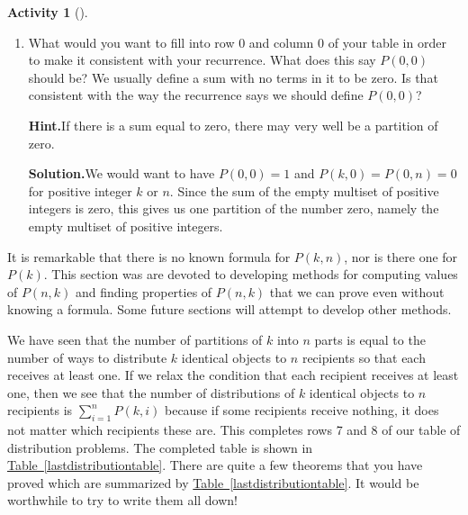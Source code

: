 \documentclass[10pt,]{book}
\theoremstyle{plain}
\theoremstyle{definition}
\newtheorem{activity}[project]{Activity}
\numberwithin{equation}{chapter}
\begin{document}
\begin{activity}[]
\begin{enumerate}[label=(\alph*)]
~\par
\item What would you want to fill into row 0 and column 0 of your table in order to make it consistent with your recurrence.  What does this say \(P(0,0)\) should be?  We usually define a sum with no terms in it to be zero. Is that consistent with the way the recurrence says we should define \(P(0,0)\)?%
\par\medskip\noindent%
\textbf{Hint.}\quad If there is a sum equal to zero, there may very well be a partition of zero.%
\par\medskip\noindent%
\textbf{Solution.}\quad We would want to have \(P(0,0)=1\) and \(P(k,0)=P(0,n)=0\) for positive integer \(k\) or \(n\). Since the sum of the empty multiset of positive integers is zero, this gives us one partition of the number zero, namely the empty multiset of positive integers.%

\end{enumerate}
\end{activity}
It is remarkable that there is no known formula for \(P(k,n)\), nor is there one for \(P(k)\). This section was are devoted to developing methods for computing values of \(P(n,k)\) and finding properties of \(P(n,k)\) that we can prove even without knowing a formula. Some future sections will attempt to develop other methods.%
\par
We have seen that the number of partitions of \(k\) into \(n\) parts is equal to the number of ways to distribute \(k\) identical objects to \(n\) recipients so that each receives at least one. If we relax the condition that each recipient receives at least one, then we see that the number of distributions of \(k\) identical objects to \(n\) recipients is \(\sum_{i=1}^n P(k,i)\) because if some recipients receive nothing, it does not matter which recipients these are. This completes rows 7 and 8 of our table of distribution problems. The completed table is shown in \hyperref[lastdistributiontable]{Table~\ref{lastdistributiontable}}. There are quite a few theorems that you have proved which are summarized by \hyperref[lastdistributiontable]{Table~\ref{lastdistributiontable}}.  It would be worthwhile to try to write them all down!%
\end{document}
